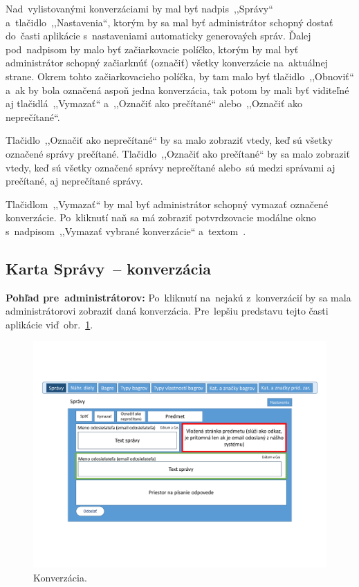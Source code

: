 Nad~vylistovanými konverzáciami by mal byť nadpis~,,Správy`` a~tlačidlo~,,Nastavenia``, ktorým by sa mal byť administrátor schopný dostať do~časti aplikácie s~nastaveniami automaticky generovaých správ. Ďalej pod~nadpisom by malo byť začiarkovacie políčko, ktorým by mal byť administrátor schopný začiarknúť (označiť) všetky konverzácie na~aktuálnej strane. Okrem tohto začiarkovacieho políčka, by tam malo byť tlačidlo~,,Obnoviť`` a~ak by bola označená aspoň jedna konverzácia, tak potom by mali byť viditeľné aj tlačidlá~,,Vymazať`` a~,,Označiť ako prečítané`` alebo~,,Označiť ako neprečítané``.

Tlačidlo~,,Označiť ako neprečítané`` by sa malo zobraziť vtedy, keď sú všetky označené správy prečítané. Tlačidlo~,,Označiť ako prečítané`` by sa malo zobraziť vtedy, keď sú všetky označené správy neprečítané alebo~sú medzi správami aj prečítané, aj neprečítané správy.

Tlačidlom~,,Vymazať`` by mal byť administrátor schopný vymazať označené konverzácie. Po~kliknutí naň sa má zobraziť potvrdzovacie modálne okno s~nadpisom~,,Vymazať vybrané konverzácie`` a~textom~.

\subsection{Karta Správy~-- konverzácia}

\textbf{Pohľad pre~administrátorov:} Po~kliknutí na~nejakú z~konverzácií by sa mala administrátorovi zobraziť daná konverzácia. Pre~lepšiu predstavu tejto časti aplikácie viď~obr.~\ref{message}.

\begin{figure}[H]\centering
\includegraphics[width=140mm]{../img/UI concept/message}
\caption{Konverzácia.}
\label{message}
\end{figure}

